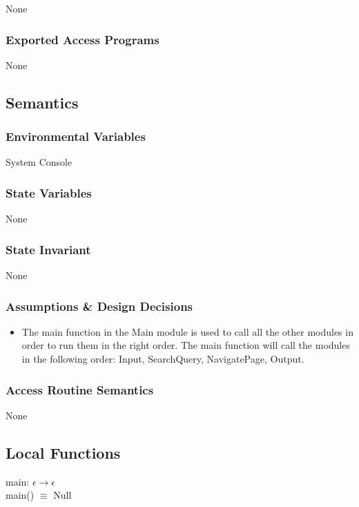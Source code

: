 \documentclass{article}
\begin{document}
None

\subsubsection* {Exported Access Programs}

None

\subsection* {Semantics}

\subsubsection* {Environmental Variables}

System Console

\subsubsection* {State Variables}

None

\subsubsection* {State Invariant}

None

\subsubsection* {Assumptions \& Design Decisions}

\begin{itemize}
    \item The main function in the Main module is used to call all the other modules in order to run them in the right order. The main function will call the modules in the following order: Input, SearchQuery, NavigatePage, Output.
\end{itemize}

\subsubsection* {Access Routine Semantics}

None

\subsection* {Local Functions}

\noindent main: $\epsilon \rightarrow \epsilon$  \\
main() $\equiv$ Null\\
\end{document}
